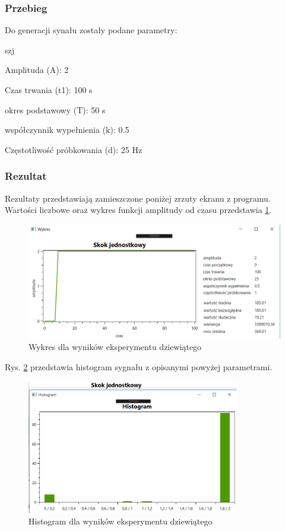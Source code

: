 \documentclass[12pt]{article}
\begin{document}
\subsubsection{Przebieg}
Do generacji synału zostały podane parametry:

\begin{labeling}{szj}
\item [Amplituda (A):] 2
\item [Czas trwania (t1):] 100 s
\item [okres podstawowy (T):] 50 s
\item [współczynnik wypełnienia (k):] 0.5
\item [Częstotliwość próbkowania (d): ] 25 Hz
\end{labeling}

\subsubsection{Rezultat}
Rezultaty przedstawiają zamieszczone poniżej zrzuty ekranu z programu. Wartości liczbowe oraz wykres funkcji amplitudy od czasu przedstawia \ref{Wykres dla wyników eksperymentu dziewiątego}.

\begin{figure}[h!]
 \centering
 \includegraphics[width=12.3cm]{SkokJed.PNG}
 \vspace{-0.3cm}
 \caption{Wykres dla wyników eksperymentu dziewiątego}
 \label{Wykres dla wyników eksperymentu dziewiątego}
\end{figure}
\newpage
Rys. \ref{Histogram dla wyników eksperymentu dziewiątego} przedstawia histogram sygnału z opisanymi powyżej parametrami. 
\begin{figure}[h!]
 \centering
 \includegraphics[width=9.3cm]{SkokJedHist.PNG}
 \vspace{-0.3cm}
 \caption{Histogram dla wyników eksperymentu dziewiątego}
 \label{Histogram dla wyników eksperymentu dziewiątego}
\end{figure}
\end{document}
